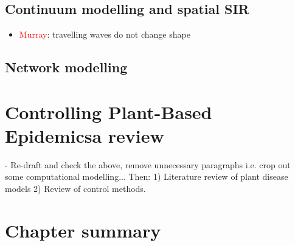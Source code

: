 \subsection{Continuum modelling and spatial SIR}
\begin{itemize}
    \item \textcolor{red}{Murray}: travelling waves do not change shape
\end{itemize}

\subsection{Network modelling}
\blindtext[1]

\section{Controlling Plant-Based Epidemics\textemdash a review}

- Re-draft and check the above, remove unnecessary paragraphs i.e. crop out some computational modelling... Then: 1) Literature review of plant disease models 2) Review of control methods.

\section{Chapter summary}